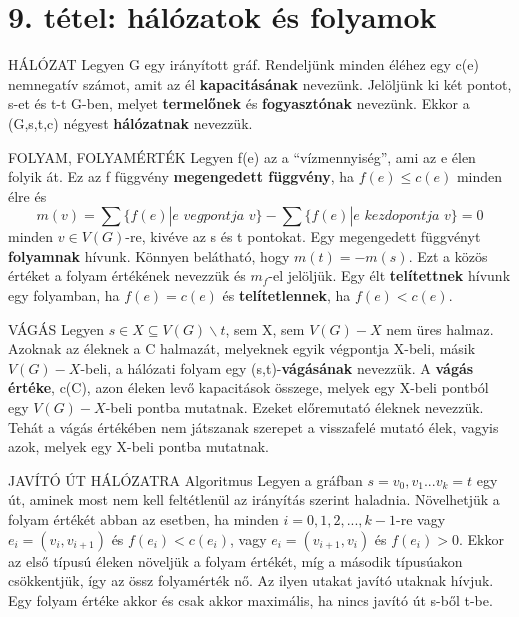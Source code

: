 \section{9. tétel: hálózatok és folyamok}

\begin{definicio}{HÁLÓZAT}
Legyen G egy irányított gráf. Rendeljünk minden éléhez egy c(e) nemnegatív számot, amit az él \textbf{kapacitásának} nevezünk. Jelöljünk ki két pontot, s-et és t-t G-ben, melyet \textbf{termelőnek} és \textbf{fogyasztónak} nevezünk. Ekkor a (G,s,t,c) négyest \textbf{hálózatnak} nevezzük.
\end{definicio}

\begin{definicio}{FOLYAM, FOLYAMÉRTÉK}
Legyen f(e) az a ``vízmennyiség'', ami az e élen folyik át. Ez az f függvény \textbf{megengedett függvény}, ha $f(e) \leq c(e)$ minden élre és
$$m(v) = \sum\{f(e)|e\,\,vegpontja\,\,v\} - \sum\{f(e) | e\,\,kezdopontja\,\,v\} = 0$$
minden $v\in V(G)$-re, kivéve az s és t pontokat. Egy megengedett függvényt \textbf{folyamnak} hívunk. Könnyen belátható, hogy $m(t) = -m(s)$. Ezt a közös értéket a folyam értékének nevezzük és $m_f$-el jelöljük. Egy élt \textbf{telítettnek} hívunk egy folyamban, ha $f(e) = c(e)$ és \textbf{telítetlennek}, ha $f(e) < c(e)$.
\end{definicio}

\begin{definicio}{VÁGÁS}
Legyen $s \in X \subseteq V(G) \backslash {t}$, sem X, sem $V(G) - X$ nem üres halmaz. Azoknak az éleknek a C halmazát, melyeknek egyik végpontja X-beli, másik $V(G) - X$-beli, a hálózati folyam egy (s,t)-\textbf{vágásának} nevezzük. A \textbf{vágás értéke}, c(C), azon éleken levő kapacitások összege, melyek egy X-beli pontból egy $V(G) - X$-beli pontba mutatnak. Ezeket előremutató éleknek nevezzük. Tehát a vágás értékében nem játszanak szerepet a visszafelé mutató élek, vagyis azok, melyek egy X-beli pontba mutatnak.
\end{definicio}

\begin{tetel}{JAVÍTÓ ÚT HÁLÓZATRA Algoritmus}
Legyen a gráfban $s = v_0, v_1... v_k = t$ egy út, aminek most nem kell feltétlenül az irányítás szerint haladnia. Növelhetjük a folyam értékét abban az esetben, ha minden $i = 0,1,2,...,k-1$-re vagy $e_i = (v_i , v_{i + 1})$ és $f(e_i) < c(e_i) $, vagy $e_i = (v_{i + 1} , v_i )$ és $f(e_i) > 0 $.
Ekkor az első típusú éleken növeljük a folyam értékét, míg a második típusúakon csökkentjük, így az össz folyamérték nő. Az ilyen utakat javító utaknak hívjuk.\\ Egy folyam értéke akkor és csak akkor maximális, ha nincs javító út s-ből t-be.
\end{tetel}

